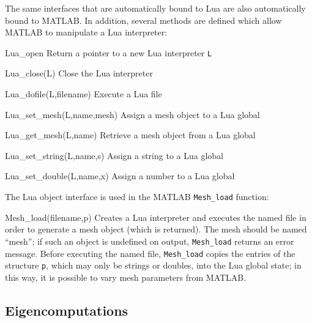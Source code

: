 \documentclass{article}
\newenvironment{codelist}[1][\quad]%
  {\begin{list}{}{%
   \settowidth{\labelwidth}{\texttt{#1}\hfil}%
   \setlength{\leftmargin}{\labelwidth}%
   \addtolength{\leftmargin}{\labelsep}%
   \addtolength{\leftmargin}{\parindent}%
   \renewcommand{\makelabel}[1]{\texttt{##1}}}}%
  {\end{list}}
\newcommand{\ttt}[1]{\texttt{#1}}
\begin{document}
The same interfaces that are automatically bound to Lua are also
automatically bound to MATLAB.  In addition, several methods are
defined which allow MATLAB to manipulate a Lua interpreter:
\begin{codelist}

  \item[Lua\_open]      
    Return a pointer to a new Lua interpreter \ttt{L}

  \item[Lua\_close(L)]  
    Close the Lua interpreter

  \item[Lua\_dofile(L,filename)]
    Execute a Lua file

  \item[Lua\_set\_mesh(L,name,mesh)]
    Assign a mesh object to a Lua global

  \item[Lua\_get\_mesh(L,name)]
    Retrieve a mesh object from a Lua global

  \item[Lua\_set\_string(L,name,s)]
    Assign a string to a Lua global

  \item[Lua\_set\_double(L,name,x)]
    Assign a number to a Lua global

\end{codelist}
The Lua object interface is used in the MATLAB \ttt{Mesh\_load}
function:
\begin{codelist}

  \item[Mesh\_load(filename,p)]
    Creates a Lua interpreter and executes the named file in order to
    generate a mesh object (which is returned).  The mesh should be
    named ``mesh''; if such an object is undefined on output,
    \ttt{Mesh\_load} returns an error message.  Before executing
    the named file, \ttt{Mesh\_load} copies the entries of the
    structure \ttt{p}, which may only be strings or doubles, into
    the Lua global state; in this way, it is possible to vary mesh
    parameters from MATLAB.

\end{codelist}


\subsection{Eigencomputations}
\end{document}
